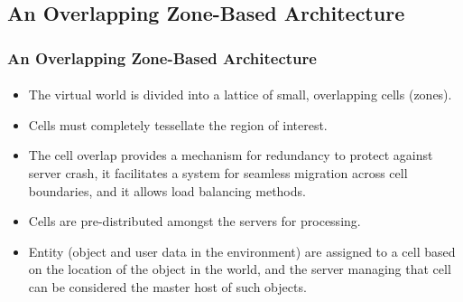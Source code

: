 \subsection{An Overlapping Zone-Based Architecture}

\begin{frame}[fragile]
\frametitle{An Overlapping Zone-Based Architecture}
\framesubtitle{}
\begin{itemize}
\item<1->
The virtual world is divided into a lattice of small, \alert{overlapping
cells} (zones).
\item<2->
Cells must completely tessellate the region of interest.
\item<3->
The cell overlap provides a mechanism for redundancy to protect against server
crash, it facilitates a system for seamless migration across cell
boundaries, and it allows load balancing methods.
\item<4->
Cells are pre-distributed amongst the servers for processing.
\item<5->
Entity (object and user data in
the environment) are assigned to a cell based on the location of
the object in the world, and the server managing that cell can be
considered the \alert{master host} of such objects.
\end{itemize}
\end{frame}

